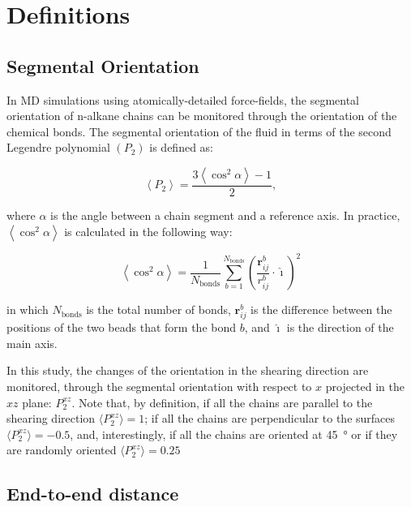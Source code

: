 \documentclass[5p]{elsarticle}
\begin{document}
\appendix

\section{Definitions}

\subsection{Segmental Orientation}

In MD simulations using atomically-detailed force-fields, the segmental orientation of n-alkane chains can be monitored through the orientation of the chemical bonds. The segmental orientation \cite{Erman1985} of the fluid in terms of the second Legendre polynomial $\left(P_2\right)$ is defined as:

\begin{equation}\label{eq:P_2}
\left\langle P_2 \right\rangle =\frac{3\left\langle \cos ^2 \alpha \right\rangle - 1}{2},
\end{equation}

where $\alpha$ is the angle between a chain segment and a reference axis. In practice, $\left\langle \cos ^2 \alpha \right\rangle$ is calculated in the following way:

\begin{equation}
\left\langle \cos ^2 \alpha \right\rangle = \frac{1}{N_\text{bonds}} \sum_{b=1}^{N_\text{bonds}} \left(\frac{\textbf{r}^b_{ij}}{r^b_{ij}} \cdot \mathbf{\hat \imath} \right)^2
\end{equation}

 in which $N_\text{bonds}$ is the total number of bonds, $\textbf{r}^b_{ij}$ is the difference between the positions of the two beads that form the bond $b$, and $\mathbf{\hat \imath}$ is the direction of the main axis. 
 
 In this study, the changes of the orientation in the shearing direction are monitored, through the segmental orientation with respect to $x$ projected in the $xz$ plane: $P_{2}^{xz}$. Note that, by definition,  if all the chains are parallel to the shearing direction $\langle P_{2}^{xz}\rangle=1 $; if all the chains are perpendicular to the surfaces $\langle P_{2}^{xz} \rangle=-0.5$, and, interestingly, if all the chains are oriented at \SI{45}{\degree} or if they are randomly oriented $\langle P_{2}^{xz}\rangle=0.25 $
 

\subsection{End-to-end distance}
\end{document}
